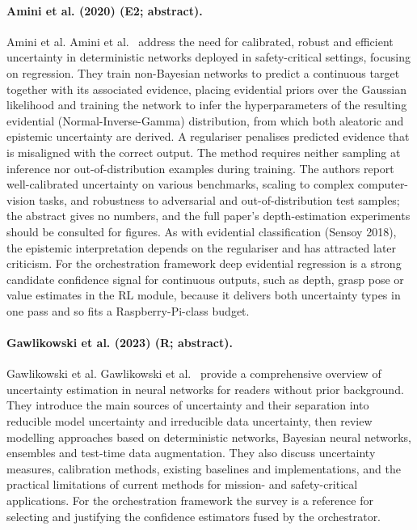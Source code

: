 \documentclass[10pt,a4paper]{article}
\begin{document}
\paragraph{Amini et al. (2020) (E2; abstract).} Amini et al. Amini et al.~\cite{Amini2020} address the need for calibrated, robust and efficient uncertainty in deterministic networks deployed in safety-critical settings, focusing on regression. They train non-Bayesian networks to predict a continuous target together with its associated evidence, placing evidential priors over the Gaussian likelihood and training the network to infer the hyperparameters of the resulting evidential (Normal-Inverse-Gamma) distribution, from which both aleatoric and epistemic uncertainty are derived. A regulariser penalises predicted evidence that is misaligned with the correct output. The method requires neither sampling at inference nor out-of-distribution examples during training. The authors report well-calibrated uncertainty on various benchmarks, scaling to complex computer-vision tasks, and robustness to adversarial and out-of-distribution test samples; the abstract gives no numbers, and the full paper's depth-estimation experiments should be consulted for figures. As with evidential classification (Sensoy 2018), the epistemic interpretation depends on the regulariser and has attracted later criticism. For the orchestration framework deep evidential regression is a strong candidate confidence signal for continuous outputs, such as depth, grasp pose or value estimates in the RL module, because it delivers both uncertainty types in one pass and so fits a Raspberry-Pi-class budget.

\paragraph{Gawlikowski et al. (2023) (R; abstract).} Gawlikowski et al. Gawlikowski et al.~\cite{Gawlikowski2023} provide a comprehensive overview of uncertainty estimation in neural networks for readers without prior background. They introduce the main sources of uncertainty and their separation into reducible model uncertainty and irreducible data uncertainty, then review modelling approaches based on deterministic networks, Bayesian neural networks, ensembles and test-time data augmentation. They also discuss uncertainty measures, calibration methods, existing baselines and implementations, and the practical limitations of current methods for mission- and safety-critical applications. For the orchestration framework the survey is a reference for selecting and justifying the confidence estimators fused by the orchestrator.
\end{document}
